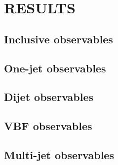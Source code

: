 \section{RESULTS}
\label{sec:hjetscomp:results}

\subsection{Inclusive observables}
\label{sec:hjetscomp:results:inclobs}

\subsection{One-jet observables}
\label{sec:hjetscomp:results:1jobs}

\subsection{Dijet observables}
\label{sec:hjetscomp:results:2jobs}

\subsection{VBF observables}
\label{sec:hjetscomp:results:VBFobs}

\subsection{Multi-jet observables}
\label{sec:hjetscomp:results:multijobs}
